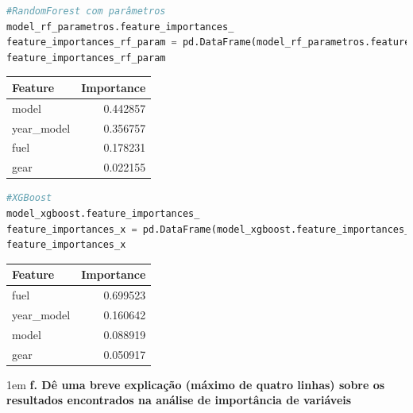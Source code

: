 \begin{lstlisting}[language=Python, style=input]
#RandomForest com parâmetros
model_rf_parametros.feature_importances_
feature_importances_rf_param = pd.DataFrame(model_rf_parametros.feature_importances_, index = X_train.columns, columns=['importance']).sort_values('importance', ascending = False)
feature_importances_rf_param
\end{lstlisting}
\begin{table}[H]
\centering
\begin{tcolorbox}[myoutputstyle]
\begin{tabular}{lr}
\hline
\textbf{Feature} & \textbf{Importance} \\
\hline
model       & 0.442857 \\
year\_model & 0.356757 \\
fuel        & 0.178231 \\
gear        & 0.022155 \\
\hline
\end{tabular}
\end{tcolorbox}
\end{table}


\begin{lstlisting}[language=Python, style=input]
#XGBoost
model_xgboost.feature_importances_
feature_importances_x = pd.DataFrame(model_xgboost.feature_importances_, index = X_train.columns, columns=['importance']).sort_values('importance', ascending = False)
feature_importances_x
\end{lstlisting}
\begin{table}[H]
\centering
\begin{tcolorbox}[myoutputstyle]
\begin{tabular}{lr}
\hline
\textbf{Feature} & \textbf{Importance} \\
\hline
fuel        & 0.699523 \\
year\_model & 0.160642 \\
model       & 0.088919 \\
gear        & 0.050917 \\
\hline
\end{tabular}
\end{tcolorbox}
\end{table}



\begin{adjustwidth}{1em}{}
\textbf{f. Dê uma breve explicação (máximo de quatro linhas) sobre os resultados encontrados na análise de importância de
variáveis}
\end{adjustwidth}

